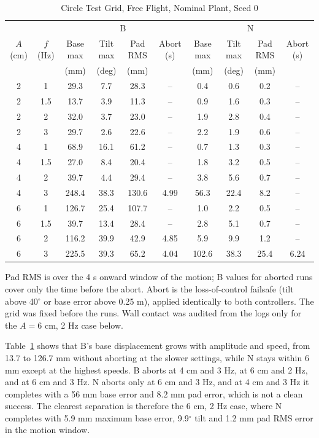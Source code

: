 \documentclass[conference]{IEEEtran}
\begin{document}
\begin{table}[t]
\caption{Circle Test Grid, Free Flight, Nominal Plant, Seed 0}
\label{tab:circlegrid}
\centering\footnotesize
\begin{tabular}{cc|cccc|cccc}\hline
 & & \multicolumn{4}{c|}{B} & \multicolumn{4}{c}{N}\\
$A$ (cm) & $f$ (Hz) & Base max & Tilt max & Pad RMS & Abort (s) & Base max & Tilt max & Pad RMS & Abort (s)\\
 & & (mm) & (deg) & (mm) & & (mm) & (deg) & (mm) & \\\hline
2 & 1 & 29.3 & 7.7 & 28.3 & -- & 0.4 & 0.6 & 0.2 & --\\
2 & 1.5 & 13.7 & 3.9 & 11.3 & -- & 0.9 & 1.6 & 0.3 & --\\
2 & 2 & 32.0 & 3.7 & 23.0 & -- & 1.9 & 2.8 & 0.4 & --\\
2 & 3 & 29.7 & 2.6 & 22.6 & -- & 2.2 & 1.9 & 0.6 & --\\
4 & 1 & 68.9 & 16.1 & 61.2 & -- & 0.7 & 1.3 & 0.3 & --\\
4 & 1.5 & 27.0 & 8.4 & 20.4 & -- & 1.8 & 3.2 & 0.5 & --\\
4 & 2 & 39.7 & 4.4 & 29.4 & -- & 3.8 & 5.6 & 0.7 & --\\
4 & 3 & 248.4 & 38.3 & 130.6 & 4.99 & 56.3 & 22.4 & 8.2 & --\\
6 & 1 & 126.7 & 25.4 & 107.7 & -- & 1.0 & 2.2 & 0.5 & --\\
6 & 1.5 & 39.7 & 13.4 & 28.4 & -- & 2.8 & 5.1 & 0.7 & --\\
6 & 2 & 116.2 & 39.9 & 42.9 & 4.85 & 5.9 & 9.9 & 1.2 & --\\
6 & 3 & 225.5 & 39.3 & 65.2 & 4.04 & 102.6 & 38.3 & 25.4 & 6.24\\
\hline
\end{tabular}
\vspace{2pt}

\parbox{.9\textwidth}{\scriptsize Pad RMS is over the 4 s onward window of the motion; B values for aborted runs cover only the time before the abort. Abort is the loss-of-control failsafe (tilt above 40$^\circ$ or base error above 0.25 m), applied identically to both controllers. The grid was fixed before the runs. Wall contact was audited from the logs only for the $A=6$ cm, 2 Hz case below.}
\end{table}

Table~\ref{tab:circlegrid} shows that B's base displacement grows with amplitude and speed, from 13.7 to 126.7 mm without aborting at the slower settings, while N stays within 6 mm except at the highest speeds. B aborts at 4 cm and 3 Hz, at 6 cm and 2 Hz, and at 6 cm and 3 Hz. N aborts only at 6 cm and 3 Hz, and at 4 cm and 3 Hz it completes with a 56 mm base error and 8.2 mm pad error, which is not a clean success. The clearest separation is therefore the 6 cm, 2 Hz case, where N completes with 5.9 mm maximum base error, 9.9$^\circ$ tilt and 1.2 mm pad RMS error in the motion window.
\end{document}
